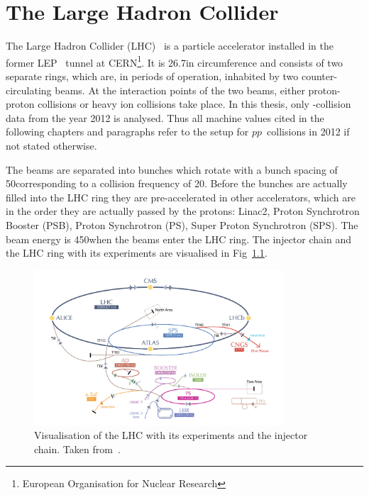 \chapter{The Large Hadron Collider}

The Large Hadron Collider (LHC)~\cite{bib:LHC_machine_2008,bib:LHC_2004} is a particle accelerator installed in the former LEP~\cite{bib:LEP_design_1984} tunnel at CERN\footnote{European Organisation for Nuclear Research}.
It is 26.7\km in circumference and consists of two separate rings, which are, in periods of operation, inhabited by two counter-circulating beams.
At the interaction points of the two beams, either proton-proton collisions or heavy ion collisions take place.
In this thesis, only \pp-collision data from the year 2012 is analysed.
Thus all machine values cited in the following chapters and paragraphs refer to the setup for $pp$~collisions in 2012 if not stated otherwise.

The beams are separated into bunches which rotate with a bunch spacing of 50\ns corresponding to a collision frequency of 20\mhz.
Before the bunches are actually filled into the LHC ring they are pre-accelerated in other accelerators, which are in the order they are actually passed by the protons: Linac2, Proton  Synchrotron Booster (PSB), Proton Synchrotron (PS), Super Proton Synchrotron (SPS).
The beam energy is 450\gev when the beams enter the LHC ring.
The injector chain and the LHC ring with its experiments are visualised in Fig~\ref{fig:LHC}.
\begin{figure}[!b]
  \centering
      \includegraphics[width=0.83\textwidth]{figures/experiment/LHC/LHC_small.png}
  \caption{Visualisation of the LHC with its experiments and the injector chain. Taken from~\cite{bib:CERNBrochure}.}  
  \label{fig:LHC}
\end{figure}

